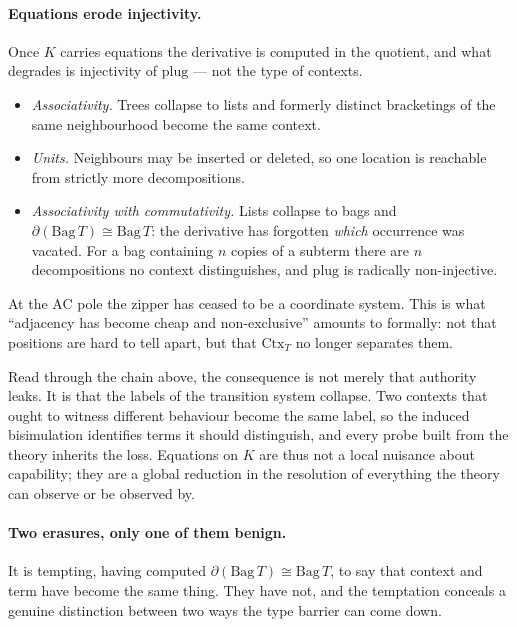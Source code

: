 \documentclass[11pt,a4paper]{article}
\theoremstyle{definition}
\theoremstyle{plain}
\theoremstyle{remark}
\newcommand{\Ctx}{\mathrm{Ctx}}
\begin{document}
\paragraph{Equations erode injectivity.}
Once $K$ carries equations the derivative is computed in the quotient, and what
degrades is injectivity of $\mathrm{plug}$ --- not the type of contexts.
\begin{itemize}[leftmargin=1.4em]
\item \emph{Associativity.} Trees collapse to lists and formerly distinct bracketings
of the same neighbourhood become the same context.
\item \emph{Units.} Neighbours may be inserted or deleted, so one location is
reachable from strictly more decompositions.
\item \emph{Associativity with commutativity.} Lists collapse to bags and
$\partial(\mathrm{Bag}\,T) \cong \mathrm{Bag}\,T$: the derivative has forgotten
\emph{which} occurrence was vacated. For a bag containing $n$ copies of a subterm
there are $n$ decompositions no context distinguishes, and $\mathrm{plug}$ is
radically non-injective.
\end{itemize}
At the AC pole the zipper has ceased to be a coordinate system. This is what
``adjacency has become cheap and non-exclusive'' amounts to formally: not that
positions are hard to tell apart, but that $\Ctx_T$ no longer separates them.

Read through the chain above, the consequence is not merely that authority leaks. It
is that the labels of the transition system collapse. Two contexts that ought to
witness different behaviour become the same label, so the induced bisimulation
identifies terms it should distinguish, and every probe built from the theory
inherits the loss. Equations on $K$ are thus not a local nuisance about capability;
they are a global reduction in the resolution of everything the theory can observe or
be observed by.

\paragraph{Two erasures, only one of them benign.}
It is tempting, having computed $\partial(\mathrm{Bag}\,T) \cong \mathrm{Bag}\,T$, to
say that context and term have become the same thing. They have not, and the
temptation conceals a genuine distinction between two ways the type barrier can come
down.
\end{document}
